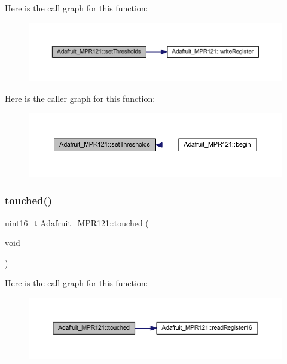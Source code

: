 Here is the call graph for this function\+:
\nopagebreak
\begin{figure}[H]
\begin{center}
\leavevmode
\includegraphics[width=350pt]{d9/d2e/class_adafruit___m_p_r121_a8588eabc494059b6fe5231b8dd2be416_cgraph}
\end{center}
\end{figure}
Here is the caller graph for this function\+:
\nopagebreak
\begin{figure}[H]
\begin{center}
\leavevmode
\includegraphics[width=350pt]{d9/d2e/class_adafruit___m_p_r121_a8588eabc494059b6fe5231b8dd2be416_icgraph}
\end{center}
\end{figure}
\mbox{\label{class_adafruit___m_p_r121_a08b26f327e99b6f205df8907eafcab4c}} 
\subsubsection{\texorpdfstring{touched()}{touched()}}
{\footnotesize\ttfamily uint16\+\_\+t Adafruit\+\_\+\+M\+P\+R121\+::touched (\begin{DoxyParamCaption}\item[{void}]{ }\end{DoxyParamCaption})}

Here is the call graph for this function\+:
\nopagebreak
\begin{figure}[H]
\begin{center}
\leavevmode
\includegraphics[width=350pt]{d9/d2e/class_adafruit___m_p_r121_a08b26f327e99b6f205df8907eafcab4c_cgraph}
\end{center}
\end{figure}
\mbox{\label{class_adafruit___m_p_r121_a5dce866e817cfc15933e56b8dc679a13}} 
